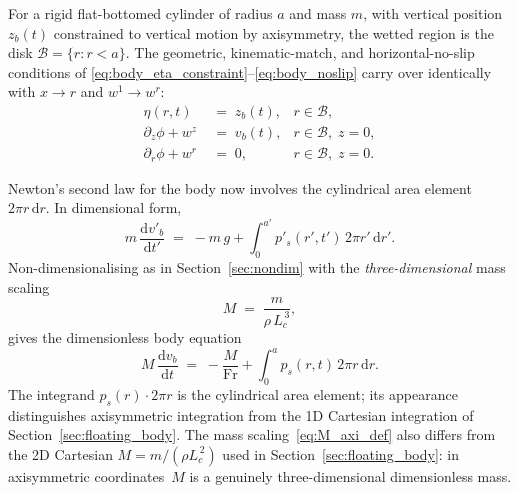 \documentclass{article}
\newcommand{\Fr}{\mathrm{Fr}}
\begin{document}
For a rigid flat-bottomed cylinder of radius $a$ and mass $m$, with vertical position $z_b(t)$ constrained to vertical motion by axisymmetry, the wetted region is the disk $\mathcal{B} = \{r : r < a\}$.
The geometric, kinematic-match, and horizontal-no-slip conditions of \eqref{eq:body_eta_constraint}--\eqref{eq:body_noslip} carry over identically with $x \to r$ and $w^1 \to w^r$:
\begin{align}
    \eta(r, t) \;&=\; z_b(t),                                & r \in \mathcal{B}, \label{eq:body_eta_axi} \\
    \partial_z \phi + w^z \;&=\; v_b(t),                     & r \in \mathcal{B},\; z = 0, \label{eq:body_kin_axi} \\
    \partial_r \phi + w^r \;&=\; 0,                          & r \in \mathcal{B},\; z = 0. \label{eq:body_noslip_axi}
\end{align}

Newton's second law for the body now involves the cylindrical area element $2\pi r\,\mathrm{d} r$.
In dimensional form,
\begin{equation}
    m\,\frac{\mathrm{d} v'_b}{\mathrm{d} t'} \;=\; -m\,g + \int_0^{a'} p'_s(r', t')\,2\pi r'\,\mathrm{d} r'. \label{eq:body_newton_axi_dim}
\end{equation}
Non-dimensionalising as in Section~\ref{sec:nondim} with the \emph{three-dimensional} mass scaling
\begin{equation}
    M \;=\; \frac{m}{\rho\,L_c^{\,3}}, \label{eq:M_axi_def}
\end{equation}
gives the dimensionless body equation
\begin{equation}
    M\,\frac{\mathrm{d} v_b}{\mathrm{d} t} \;=\; -\frac{M}{\Fr} + \int_0^{a} p_s(r, t)\,2\pi r\,\mathrm{d} r. \label{eq:body_newton_axi}
\end{equation}
The integrand $p_s(r)\cdot 2\pi r$ is the cylindrical area element; its appearance distinguishes axisymmetric integration from the 1D Cartesian integration of Section~\ref{sec:floating_body}.
The mass scaling~\eqref{eq:M_axi_def} also differs from the 2D Cartesian $M = m/(\rho L_c^{\,2})$ used in Section~\ref{sec:floating_body}: in axisymmetric coordinates~$M$ is a genuinely three-dimensional dimensionless mass.
\end{document}
